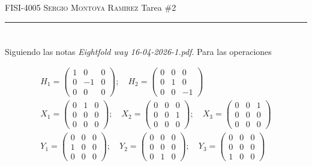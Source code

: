 \documentclass[12pt]{amsart}
\begin{document}
\thispagestyle{empty}

{\scshape FISI-4005} \hfill {\scshape \large Sergio Montoya Ramirez} \hfill {Tarea \#2\scshape }

\smallskip

\hrule

\section{}

Siguiendo las notas \textit{Eightfold way 16-04-2026-1.pdf}. Para las operaciones

\begin{align*}
  H_1 =
  \begin{pmatrix}
    1 &  0 & 0 \\
    0 & -1 & 0 \\
    0 &  0 & 0
  \end{pmatrix}; \quad
  H_2 =
  \begin{pmatrix}
    0 & 0 & 0 \\
    0 & 1 & 0 \\
    0 & 0 & -1
  \end{pmatrix}\\
  X_1 =
  \begin{pmatrix}
    0 & 1 & 0 \\
    0 & 0 & 0 \\
    0 & 0 & 0
  \end{pmatrix}; \quad
  X_2 =
  \begin{pmatrix}
    0 & 0 & 0 \\
    0 & 0 & 1 \\
    0 & 0 & 0
  \end{pmatrix}; \quad
  X_3 =
  \begin{pmatrix}
    0 & 0 & 1 \\
    0 & 0 & 0 \\
    0 & 0 & 0
  \end{pmatrix}\\
  Y_1 =
  \begin{pmatrix}
    0 & 0 & 0 \\
    1 & 0 & 0 \\
    0 & 0 & 0
  \end{pmatrix}; \quad
  Y_2 =
  \begin{pmatrix}
    0 & 0 & 0 \\
    0 & 0 & 0 \\
    0 & 1 & 0
  \end{pmatrix}; \quad
  Y_3 =
  \begin{pmatrix}
    0 & 0 & 0 \\
    0 & 0 & 0 \\
    1 & 0 & 0
  \end{pmatrix}\\
\end{align*}
\end{document}
